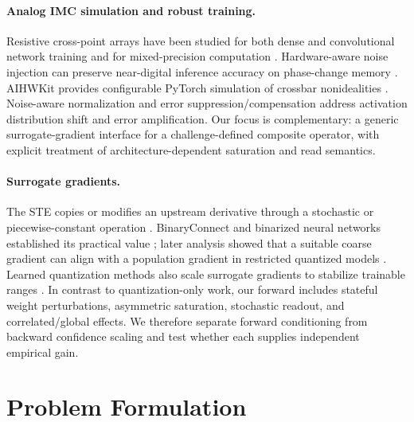 \documentclass[10pt,twocolumn,letterpaper]{article}
\begin{document}
\paragraph{Analog IMC simulation and robust training.}
Resistive cross-point arrays have been studied for both dense and convolutional
network training \citep{gokmen2016acceleration,gokmen2017convolutional} and for
mixed-precision computation \citep{legallo2018mixed}.  Hardware-aware noise
injection can preserve near-digital inference accuracy on phase-change memory
\citep{joshi2020accurate}.  AIHWKit provides configurable PyTorch simulation of
crossbar nonidealities \citep{rasch2021aihwkit}.  Noise-aware normalization
\citep{tsai2020noiseaware} and error suppression/compensation
\citep{eldebiky2022correctnet} address activation distribution shift and error
amplification.  Our focus is complementary: a generic surrogate-gradient
interface for a challenge-defined composite operator, with explicit treatment
of architecture-dependent saturation and read semantics.

\paragraph{Surrogate gradients.}
The STE copies or modifies an upstream derivative through a stochastic or
piecewise-constant operation \citep{bengio2013estimating}.  BinaryConnect and
binarized neural networks established its practical value
\citep{courbariaux2015binaryconnect,hubara2016binarized}; later analysis showed
that a suitable coarse gradient can align with a population gradient in
restricted quantized models \citep{yin2019understanding}.  Learned quantization
methods also scale surrogate gradients to stabilize trainable ranges
\citep{esser2020learned}.  In contrast to quantization-only work, our forward
includes stateful weight perturbations, asymmetric saturation, stochastic
readout, and correlated/global effects.  We therefore separate forward
conditioning from backward confidence scaling and test whether each supplies
independent empirical gain.

\section{Problem Formulation}
\label{sec:problem}
\end{document}
